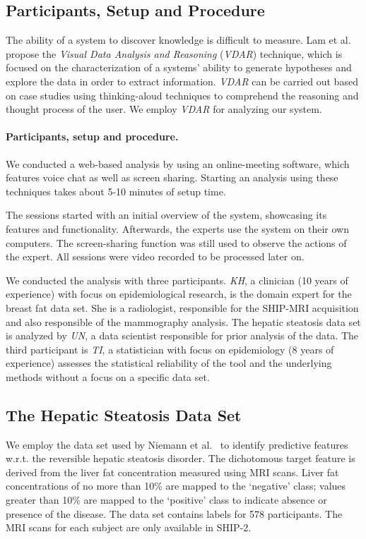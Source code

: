 \documentclass[journal]{style/vgtc} 			          %
\begin{document}
\subsection{Participants, Setup and Procedure}
The ability of a system to discover knowledge is difficult to measure.
Lam et al.~\cite{Lam2012} propose the \emph{Visual Data Analysis and Reasoning} (\emph{VDAR}) technique, which is focused on the characterization of a systems' ability to generate hypotheses and explore the data in order to extract information.
\emph{VDAR} can be carried out based on case studies using thinking-aloud techniques to comprehend the reasoning and thought process of the user.
We employ \emph{VDAR} for analyzing our system.
\paragraph{Participants, setup and procedure.}
We conducted a web-based analysis by using an online-meeting software, which features voice chat as well as screen sharing.
Starting an analysis using these techniques takes about 5-10 minutes of setup time.

The sessions started with an initial overview of the system, showcasing its features and functionality.
Afterwards, the experts use the system on their own computers.
The screen-sharing function was still used to observe the actions of the expert.
All sessions were video recorded to be processed later on.

We conducted the analysis with three participants.
\emph{KH}, a clinician (10 years of experience) with focus on epidemiological research, is the domain expert for the breast fat data set.
She is a radiologist, responsible for the SHIP-MRI acquisition and also responsible of the mammography analysis.
The hepatic steatosis data set is analyzed by \emph{UN}, a data scientist responsible for prior analysis of the data.
The third participant is \emph{TI}, a statistician with focus on epidemiology (8 years of experience) assesses the statistical reliability of the tool and the underlying methods without a focus on a specific data set.
\subsection{The Hepatic Steatosis Data Set}
We employ the data set used by Niemann et al.~\cite{Niemann2014} to identify predictive features w.r.t. the reversible hepatic steatosis disorder.
The dichotomous target feature is derived from the liver fat concentration measured using MRI scans.
Liver fat concentrations of no more than 10\% are mapped to the `negative' class; values greater than 10\% are mapped to the `positive' class to indicate absence or presence of the disease.
The data set contains labels for 578 participants. %
The MRI scans for each subject are only available in SHIP-2. %
\end{document}
